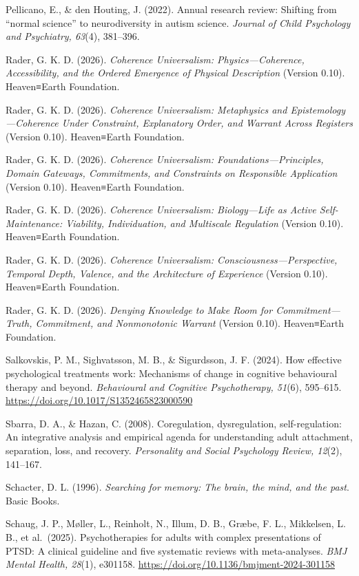 \documentclass[
  11pt,
]{article}
\begin{document}
Pellicano, E., \& den Houting, J. (2022). Annual research review:
Shifting from ``normal science'' to neurodiversity in autism science.
\emph{Journal of Child Psychology and Psychiatry, 63}(4), 381--396.

Rader, G. K. D. (2026). \emph{Coherence Universalism:
Physics---Coherence, Accessibility, and the Ordered Emergence of
Physical Description} (Version 0.10). Heaven≡Earth Foundation.

Rader, G. K. D. (2026). \emph{Coherence Universalism: Metaphysics and
Epistemology---Coherence Under Constraint, Explanatory Order, and
Warrant Across Registers} (Version 0.10). Heaven≡Earth Foundation.

Rader, G. K. D. (2026). \emph{Coherence Universalism:
Foundations---Principles, Domain Gateways, Commitments, and Constraints
on Responsible Application} (Version 0.10). Heaven≡Earth Foundation.

Rader, G. K. D. (2026). \emph{Coherence Universalism: Biology---Life as
Active Self-Maintenance: Viability, Individuation, and Multiscale
Regulation} (Version 0.10). Heaven≡Earth Foundation.

Rader, G. K. D. (2026). \emph{Coherence Universalism:
Consciousness---Perspective, Temporal Depth, Valence, and the
Architecture of Experience} (Version 0.10). Heaven≡Earth Foundation.

Rader, G. K. D. (2026). \emph{Denying Knowledge to Make Room for
Commitment---Truth, Commitment, and Nonmonotonic Warrant} (Version
0.10). Heaven≡Earth Foundation.

Salkovskis, P. M., Sighvatsson, M. B., \& Sigurdsson, J. F. (2024). How
effective psychological treatments work: Mechanisms of change in
cognitive behavioural therapy and beyond. \emph{Behavioural and
Cognitive Psychotherapy, 51}(6), 595--615.
\url{https://doi.org/10.1017/S1352465823000590}

Sbarra, D. A., \& Hazan, C. (2008). Coregulation, dysregulation,
self-regulation: An integrative analysis and empirical agenda for
understanding adult attachment, separation, loss, and recovery.
\emph{Personality and Social Psychology Review, 12}(2), 141--167.

Schacter, D. L. (1996). \emph{Searching for memory: The brain, the mind,
and the past}. Basic Books.

Schaug, J. P., Møller, L., Reinholt, N., Illum, D. B., Græbe, F. L.,
Mikkelsen, L. B., et al.~(2025). Psychotherapies for adults with complex
presentations of PTSD: A clinical guideline and five systematic reviews
with meta-analyses. \emph{BMJ Mental Health, 28}(1), e301158.
\url{https://doi.org/10.1136/bmjment-2024-301158}
\end{document}
